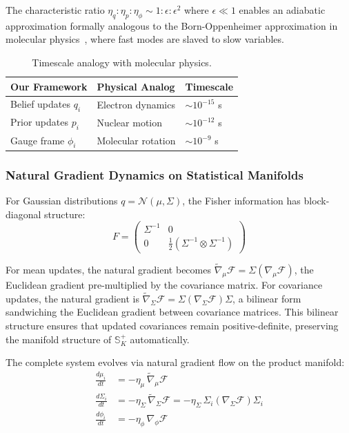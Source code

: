 \documentclass[11pt]{article}
\begin{document}
The characteristic ratio $\eta_q : \eta_p : \eta_\phi \sim 1 : \epsilon : \epsilon^2$ where $\epsilon \ll 1$ enables an adiabatic approximation formally analogous to the Born-Oppenheimer approximation in molecular physics~\cite{Born1927}, where fast modes are slaved to slow variables.

\begin{table}[h]
\centering
\begin{tabular}{|l|l|l|}
\hline
\textbf{Our Framework} & \textbf{Physical Analog} & \textbf{Timescale} \\
\hline
Belief updates $q_i$ & Electron dynamics & $\sim 10^{-15}$ s \\
Prior updates $p_i$ & Nuclear motion & $\sim 10^{-12}$ s \\
Gauge frame $\phi_i$ & Molecular rotation & $\sim 10^{-9}$ s \\
\hline
\end{tabular}
\caption{Timescale analogy with molecular physics.}
\end{table}

\subsubsection{Natural Gradient Dynamics on Statistical Manifolds}

For Gaussian distributions $q = \mathcal{N}(\mu, \Sigma)$, the Fisher information has block-diagonal structure:
\begin{equation}
F = \begin{pmatrix}
\Sigma^{-1} & 0 \\
0 & \frac{1}{2}(\Sigma^{-1} \otimes \Sigma^{-1})
\end{pmatrix}
\end{equation}

For mean updates, the natural gradient becomes $\tilde{\nabla}_\mu \mathcal{F} = \Sigma (\nabla_\mu \mathcal{F})$, the Euclidean gradient pre-multiplied by the covariance matrix. For covariance updates, the natural gradient is $\tilde{\nabla}_\Sigma \mathcal{F} = \Sigma (\nabla_\Sigma \mathcal{F}) \Sigma$, a bilinear form sandwiching the Euclidean gradient between covariance matrices. This bilinear structure ensures that updated covariances remain positive-definite, preserving the manifold structure of $\mathbb{S}^+_K$ automatically.

The complete system evolves via natural gradient flow on the product manifold:
\begin{align}
\frac{d\mu_i}{dt} &= -\eta_\mu \, \tilde{\nabla}_\mu \mathcal{F} \\
\frac{d\Sigma_i}{dt} &= -\eta_\Sigma \, \tilde{\nabla}_\Sigma \mathcal{F} = -\eta_\Sigma \, \Sigma_i (\nabla_\Sigma \mathcal{F}) \Sigma_i \\
\frac{d\phi_i}{dt} &= -\eta_\phi \, \nabla_\phi \mathcal{F}
\end{align}
\end{document}
